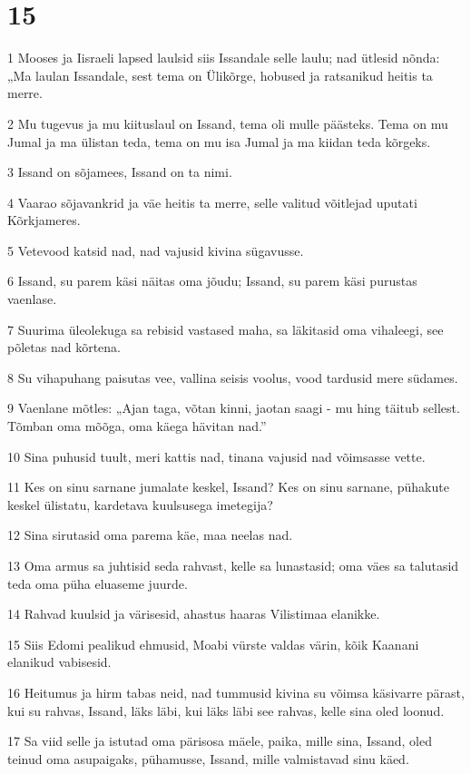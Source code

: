 \chapter{15}

\par 1 Mooses ja Iisraeli lapsed laulsid siis Issandale selle laulu; nad ütlesid nõnda: „Ma laulan Issandale, sest tema on Ülikõrge, hobused ja ratsanikud heitis ta merre.
\par 2 Mu tugevus ja mu kiituslaul on Issand, tema oli mulle päästeks. Tema on mu Jumal ja ma ülistan teda, tema on mu isa Jumal ja ma kiidan teda kõrgeks.
\par 3 Issand on sõjamees, Issand on ta nimi.
\par 4 Vaarao sõjavankrid ja väe heitis ta merre, selle valitud võitlejad uputati Kõrkjameres.
\par 5 Vetevood katsid nad, nad vajusid kivina sügavusse.
\par 6 Issand, su parem käsi näitas oma jõudu; Issand, su parem käsi purustas vaenlase.
\par 7 Suurima üleolekuga sa rebisid vastased maha, sa läkitasid oma vihaleegi, see põletas nad kõrtena.
\par 8 Su vihapuhang paisutas vee, vallina seisis voolus, vood tardusid mere südames.
\par 9 Vaenlane mõtles: „Ajan taga, võtan kinni, jaotan saagi - mu hing täitub sellest. Tõmban oma mõõga, oma käega hävitan nad.”
\par 10 Sina puhusid tuult, meri kattis nad, tinana vajusid nad võimsasse vette.
\par 11 Kes on sinu sarnane jumalate keskel, Issand? Kes on sinu sarnane, pühakute keskel ülistatu, kardetava kuulsusega imetegija?
\par 12 Sina sirutasid oma parema käe, maa neelas nad.
\par 13 Oma armus sa juhtisid seda rahvast, kelle sa lunastasid; oma väes sa talutasid teda oma püha eluaseme juurde.
\par 14 Rahvad kuulsid ja värisesid, ahastus haaras Vilistimaa elanikke.
\par 15 Siis Edomi pealikud ehmusid, Moabi vürste valdas värin, kõik Kaanani elanikud vabisesid.
\par 16 Heitumus ja hirm tabas neid, nad tummusid kivina su võimsa käsivarre pärast, kui su rahvas, Issand, läks läbi, kui läks läbi see rahvas, kelle sina oled loonud.
\par 17 Sa viid selle ja istutad oma pärisosa mäele, paika, mille sina, Issand, oled teinud oma asupaigaks, pühamusse, Issand, mille valmistavad sinu käed.
